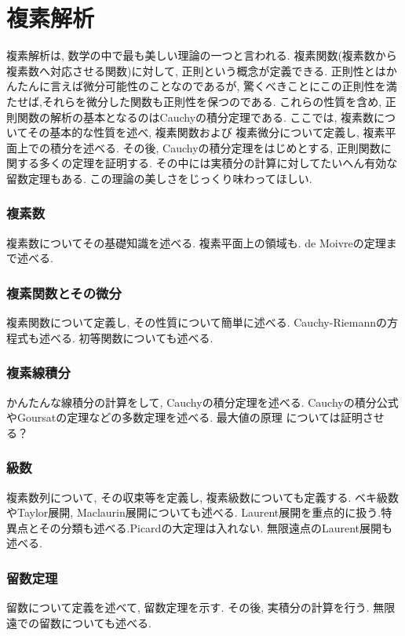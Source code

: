 \documentclass[a4j,dvipdfmx]{jsarticle}
\numberwithin{equation}{section}
\begin{document}
    \part{複素解析}
    \begin{screen}
        複素解析は, 数学の中で最も美しい理論の一つと言われる. 複素関数(複素数から複素数へ対応させる関数)に対して, 正則という概念が定義できる.
        正則性とはかんたんに言えば微分可能性のことなのであるが, 驚くべきことにこの正則性を満たせば,それらを微分した関数も正則性を保つのである. 
        これらの性質を含め, 正則関数の解析の基本となるのはCauchyの積分定理である. ここでは, 複素数についてその基本的な性質を述べ, 複素関数および
        複素微分について定義し, 複素平面上での積分を述べる. その後, Cauchyの積分定理をはじめとする, 正則関数に関する多くの定理を証明する.
        その中には実積分の計算に対してたいへん有効な留数定理もある. この理論の美しさをじっくり味わってほしい.
    \end{screen}
    \clearpage
    \section{複素数}
        複素数についてその基礎知識を述べる. 複素平面上の領域も. de Moivreの定理まで述べる.
    \clearpage
    \section{複素関数とその微分}
        複素関数について定義し, その性質について簡単に述べる. Cauchy-Riemannの方程式も述べる. 初等関数についても述べる.
    \clearpage
    \section{複素線積分}
        かんたんな線積分の計算をして, Cauchyの積分定理を述べる. Cauchyの積分公式やGoursatの定理などの多数定理を述べる. 最大値の原理
        については証明させる？
    \clearpage
    \section{級数}
        複素数列について, その収束等を定義し, 複素級数についても定義する. ベキ級数やTaylor展開, Maclaurin展開についても述べる.
        Laurent展開を重点的に扱う.特異点とその分類も述べる.Picardの大定理は入れない. 無限遠点のLaurent展開も述べる.
    \clearpage
    \section{留数定理}
        留数について定義を述べて, 留数定理を示す. その後, 実積分の計算を行う. 無限遠での留数についても述べる.
    \clearpage
\end{document}
